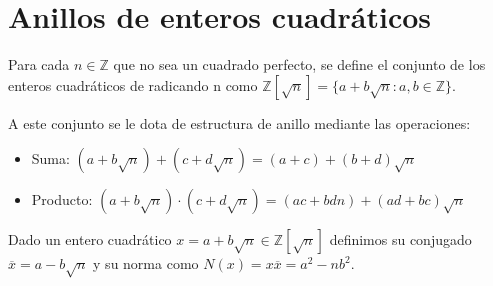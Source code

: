\section{Anillos de enteros cuadráticos}

\begin{definition}
Para cada $n \in \mathbb{Z}$ que no sea un cuadrado perfecto, se define el conjunto de los enteros cuadráticos de radicando n como $\mathbb{Z}[\sqrt{n}] = \{a+b\sqrt{n}:a,b \in \mathbb{Z}\}$.

A este conjunto se le dota de estructura de anillo mediante las operaciones:

\begin{itemize}
\item Suma: $(a+b\sqrt{n})+(c+d\sqrt{n}) = (a+c) + (b+d)\sqrt{n}$
\item Producto: $(a+b\sqrt{n}) \cdot (c+d\sqrt{n}) = (ac+bdn)+(ad+bc)\sqrt{n}$
\end{itemize}

Dado un entero cuadrático $x = a + b \sqrt{n} \in \mathbb{Z}[\sqrt{n}]$ definimos su conjugado $\overline{x} = a - b \sqrt{n}$ y su norma como $N(x) = x \overline{x} = a^2-nb^2$. 
\end{definition}

